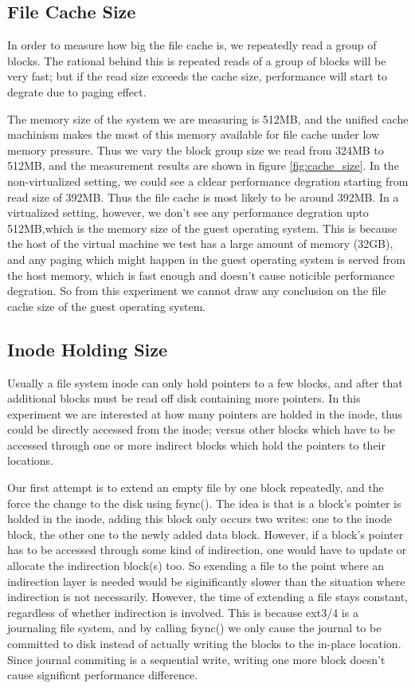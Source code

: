 \subsection{File Cache Size}
In order to measure how big the file cache is, we repeatedly read a group of blocks. The rational behind this is repeated reads of a group of blocks will be very fast; but if the read size exceeds the cache size, performance will start to degrate due to paging effect.

The memory size of the system we are measuring is 512MB, and the unified cache machinism makes the most of this memory available for file cache under low memory pressure. Thus we vary the block group size we read from 324MB to 512MB, and the measurement results are shown in figure \ref{fig:cache_size}. In the non-virtualized setting, we could see a cldear performance degration starting from read size of 392MB. Thus the file cache is most likely to be around 392MB. In a virtualized setting, however, we don't see any performance degration upto 512MB,which is the memory size of the guest operating system. This is because the host of the virtual machine we test has a large amount of memory (32GB), and any paging which might happen in the guest operating system is served from the host memory, which is fast enough and doesn't cause noticible performance degration. So from this experiment we cannot draw any conclusion on the file cache size of the guest operating system.


\subsection{Inode Holding Size}
Usually a file system inode can only hold pointers to a few blocks, and after that additional blocks must be read off disk containing more pointers. In this experiment we are interested at how many pointers are holded in the inode, thus could be directly accessed from the inode; versus other blocks which have to be accessed through one or more indirect blocks which hold the pointers to their locations.

Our first attempt is to extend an empty file by one block repeatedly, and the force the change to the disk using fsync(). The idea is that is a block's pointer is holded in the inode, adding this block only occurs two writes: one to the inode block, the other one to the newly added data block. However, if a block's pointer has to be accessed through some kind of indirection, one would have to update or allocate the indirection block(s) too. So exending a file to the point where an indirection layer is needed would be siginificantly slower than the situation where indirection is not necessarily. However, the time of extending a file stays constant, regardless of whether indirection is involved. This is because ext3/4 is a journaling file system, and by calling fsync() we only cause the journal to be committed to disk instead of actually writing the blocks to the in-place location. Since journal commiting is a sequential write, writing one more block doesn't cause significnt performance difference.

